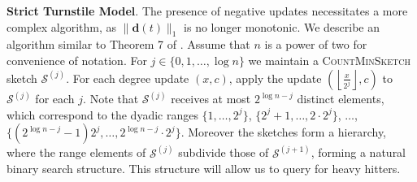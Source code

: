 \documentclass{report}
\newcommand{\algoname}[1]{\textnormal{\textsc{#1}}}
\begin{document}
\textbf{Strict Turnstile Model}.
The presence of negative updates necessitates a more complex algorithm, as $\|\mathbf{d}(t)\|_1$ is no longer monotonic.
We describe an algorithm similar to Theorem 7 of \cite{cormode2005improved}.
Assume that $n$ is a power of two for convenience of notation.
For $j \in \{0, 1, \dots, \log n\}$ we maintain a \algoname{CountMinSketch} sketch $\mathcal{S}^{(j)}$.
For each degree update $(x, c)$, apply the update $\left ( \left \lfloor \frac{x}{2^j} \right \rfloor, c \right )$ to $\mathcal{S}^{(j)}$ for each $j$.
Note that $\mathcal{S}^{(j)}$ receives at most $2^{\log n - j}$ distinct elements, which correspond to the dyadic ranges $\{1, \dots, 2^j\}$, $\{2^j + 1, \dots, 2 \cdot 2^j\}$, $\dots$, $\{(2^{\log n - j} - 1) 2^j, \dots, 2^{\log n - j} \cdot 2^j\}$. 
Moreover the sketches form a hierarchy, where the range elements of $\mathcal{S}^{(j)}$ subdivide those of $\mathcal{S}^{(j+1)}$, forming a natural binary search structure.
This structure will allow us to query for heavy hitters.
\end{document}
